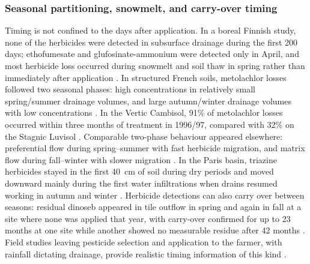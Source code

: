 \subsubsection{Seasonal partitioning, snowmelt, and carry-over timing}
Timing is not confined to the days after application. In a boreal Finnish study, none of the herbicides were detected in subsurface drainage during the first 200 days; ethofumesate and glufosinate-ammonium were detected only in April, and most herbicide loss occurred during snowmelt and soil thaw in spring rather than immediately after application \parencite{Siimes2006}. In structured French soils, metolachlor losses followed two seasonal phases: high concentrations in relatively small spring/summer drainage volumes, and large autumn/winter drainage volumes with low concentrations \parencite{Novak2001}. In the Vertic Cambisol, 91\% of metolachlor losses occurred within three months of treatment in 1996/97, compared with 32\% on the Stagnic Luvisol \parencite{Novak2001}. Comparable two-phase behaviour appeared elsewhere: preferential flow during spring--summer with fast herbicide migration, and matrix flow during fall--winter with slower migration \parencite{Dousset2004}. In the Paris basin, triazine herbicides stayed in the first 40~cm of soil during dry periods and moved downward mainly during the first water infiltrations when drains resumed working in autumn and winter \parencite{Garmouma1998}. Herbicide detections can also carry over between seasons: residual dinoseb appeared in tile outflow in spring and again in fall at a site where none was applied that year, with carry-over confirmed for up to 23 months at one site while another showed no measurable residue after 42 months \parencite{ONEILL1989}. Field studies leaving pesticide selection and application to the farmer, with rainfall dictating drainage, provide realistic timing information of this kind \parencite{ONEILL1989}.

